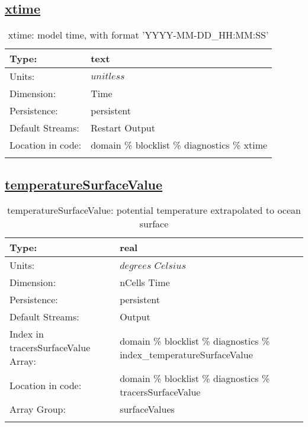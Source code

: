 \subsection[xtime]{\hyperref[sec:var_tab_diagnostics]{xtime}}
\label{subsec:var_sec_diagnostics_xtime}
\begin{center}
\begin{longtable}{| p{2.0in} | p{4.0in} |}
        \hline 
        Type: & text \\
        \hline 
        Units: & $unitless$ \\
        \hline 
        Dimension: & Time \\
        \hline 
        Persistence: & persistent \\
        \hline 
		 Default Streams: & Restart Output  \\
        \hline 
		 Location in code: & domain \% blocklist \% diagnostics \% xtime \\
		 \hline 
    \caption{xtime: model time, with format 'YYYY-MM-DD\_HH:MM:SS'}
\end{longtable}
\end{center}
\subsection[temperatureSurfaceValue]{\hyperref[sec:var_tab_diagnostics]{temperatureSurfaceValue}}
\label{subsec:var_sec_diagnostics_temperatureSurfaceValue}
\begin{center}
\begin{longtable}{| p{2.0in} | p{4.0in} |}
        \hline 
        Type: & real \\
        \hline 
        Units: & $degrees$ $Celsius$ \\
        \hline 
        Dimension: & nCells Time \\
        \hline 
        Persistence: & persistent \\
        \hline 
		 Default Streams: & Output  \\
        \hline 
		 Index in tracersSurfaceValue Array: & domain \% blocklist \% diagnostics \% index\_temperatureSurfaceValue \\
		 \hline 
		 Location in code: & domain \% blocklist \% diagnostics \% tracersSurfaceValue \\
		 \hline 
		 Array Group: & surfaceValues \\
		 \hline 
    \caption{temperatureSurfaceValue: potential temperature extrapolated to ocean surface}
\end{longtable}
\end{center}
